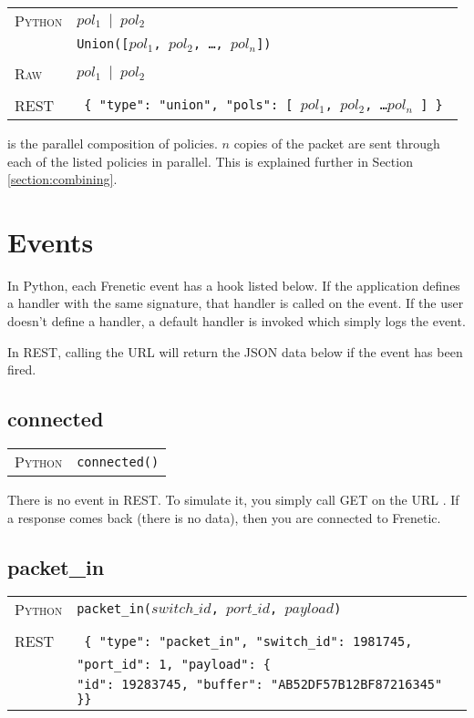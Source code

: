 \bigskip
\begin{tabularx}{\linewidth}{lX}
\textsc{Python}   & \texttt{$pol_1$ $\vert$ $pol_2$} \\
    & \texttt{Union([$pol_1$, $pol_2$, \ldots, $pol_n$])} \\ \\
\textsc{Raw}    & \texttt{$pol_1$ $\vert$  $pol_2$}  \\ \\
\textsc{REST} & \texttt{ \{ "type": "union", "pols": [ $pol_1$, $pol_2$, \ldots $pol_n$ ] \} } 
\end{tabularx}

 is the parallel composition of policies.  $n$ copies of the packet are sent through
each of the listed policies in parallel.  This is explained further in Section \ref{section:combining}.

\section{Events}

In Python, each Frenetic event has a hook listed below.  If the application defines a handler with the same
signature, that handler is called on the event.  If the user doesn't define a handler, a default handler is
invoked which simply logs the event.  

In REST, calling the URL  will
return the JSON data below if the event has been fired. 

\subsection{connected}

\bigskip
\begin{tabularx}{\linewidth}{lX}
\textsc{Python}   & \texttt{connected()} \\
\end{tabularx}

There is no  event in REST.  To simulate it, you simply call GET on the URL .  If 
a response comes back (there is no data), then you are connected to Frenetic.

\subsection{packet\_in}

\bigskip
\begin{tabularx}{\linewidth}{lX}
\textsc{Python}   & \texttt{packet\_in($switch\_id$, $port\_id$, $payload$)} \\ \\
\textsc{REST} & \texttt{ \{ "type": "packet\_in", "switch\_id": 1981745, } \\
  & \texttt{"port\_id": 1, "payload": \{ } \\
  & \texttt{"id": 19283745, "buffer": "AB52DF57B12BF87216345" \}\} }
\end{tabularx}

